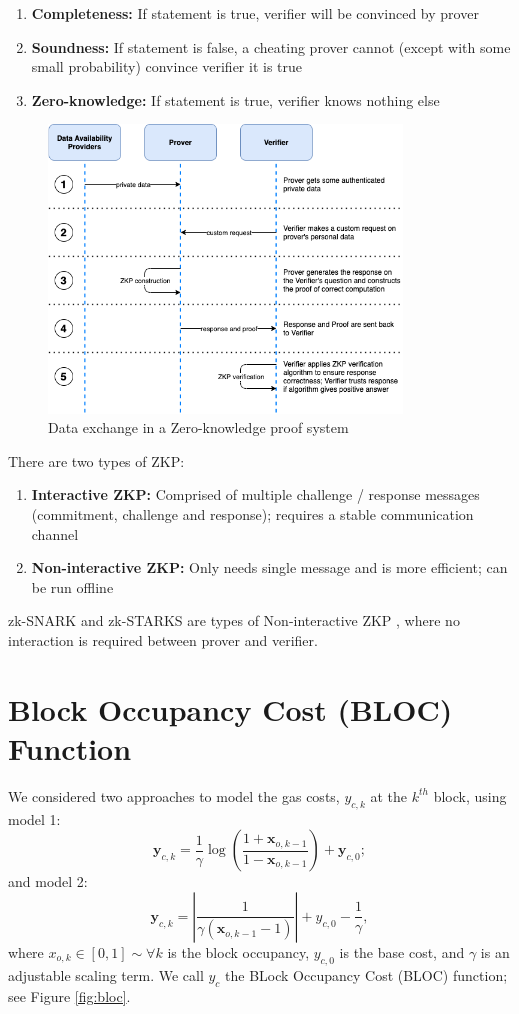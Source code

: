 \documentclass[peerreview]{ieeesyscoin}
\begin{document}
\begin{enumerate}
\item \textbf{Completeness:} If statement is true, verifier will be convinced by prover
\item\textbf{Soundness:} If statement is false, a cheating prover cannot (except with some small probability) convince verifier it is true
\item \textbf{Zero-knowledge:} If statement is true, verifier knows nothing else
\end{enumerate}

\begin{figure}[h!]
\includegraphics[width=3.7in]{img/zkp.png}
\caption{Data exchange in a Zero-knowledge proof system} 
\label{fig:zkp}
\end{figure} 

There are two types of ZKP:

\begin{enumerate}
\item \textbf{Interactive ZKP:} Comprised of multiple challenge / response messages (commitment, challenge and response); requires a stable communication channel
\item \textbf{Non-interactive ZKP:} Only needs single message and is more efficient; can be run offline
\end{enumerate}
zk-SNARK and zk-STARKS are types of Non-interactive ZKP , where no interaction is required between prover and verifier.

\section{Block Occupancy Cost (BLOC) Function}

We considered two approaches to model the gas costs, $y_{c,k}$ at the $k^{th}$ block, using model 1:
\begin{equation}
\mathbf{y}_{c,k} = \dfrac{1}{\gamma}\log\left(\dfrac{1+\mathbf{x}_{o,k-1}}{1-\mathbf{x}_{o,k-1}}\right) + \mathbf{y}_{c,0};
\end{equation}
and model 2:
\begin{equation}
\mathbf{y}_{c,k} = \left| \dfrac{1}{\gamma(\mathbf{x}_{o,k-1}-1)} \right| + y_{c,0} - \dfrac{1}{\gamma},
\end{equation}
where $x_{o,k} \in [0,1] \sim \forall k$ is the block occupancy, $y_{c,0}$ is the base cost, and $\gamma$ is an adjustable scaling term. We call $y_{c}$ the BLock Occupancy Cost (BLOC) function; see Figure \ref{fig:bloc}.
\end{document}
